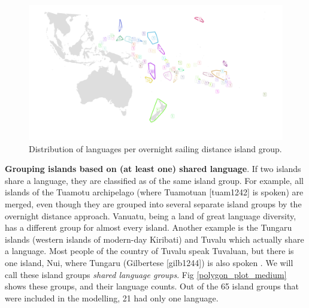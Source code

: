 \documentclass[12pt,letterpaper]{article}
\begin{document}
\begin{figure}
\centering
\includegraphics[width=\textwidth]{polygon_SBZR_group_map.png}
\caption{{Distribution of languages per overnight sailing distance island group.}}
\label{polygon_plot_SBZR}
\end{figure}



\textbf{Grouping islands based on (at least one) shared language}. If two islands share a language, they are classified as of the same island group. For example, all islands of the Tuamotu archipelago (where Tuamotuan [tuam1242] is spoken) are merged, even though they are grouped into several separate island groups by the overnight distance approach. Vanuatu, being a land of great language diversity, has a different group for almost every island. Another example is the Tungaru islands (western islands of modern-day Kiribati) and Tuvalu which actually share a language. Most people of the country of Tuvalu speak Tuvaluan, but there is one island, Nui, where Tungaru (Gilbertese [gilb1244]) is also spoken \citep{faaniu1983tuvalu, macdonald_2020, omniglot_tuvaluan}. We will call these island groups \textit{shared language groups}. Fig \ref{polygon_plot_medium} shows these groups, and their language counts. Out of the 65 island groups that were included in the modelling, 21 had only one language.
\end{document}
